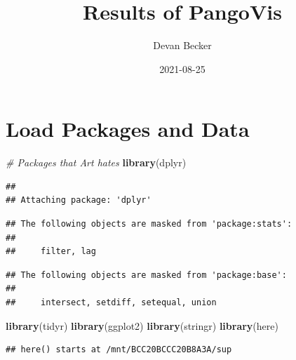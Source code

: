 \documentclass[
]{article}
\title{Results of PangoVis}
\author{Devan Becker}
\date{2021-08-25}
\newenvironment{Shaded}{\begin{snugshade}}{\end{snugshade}}
\newcommand{\CommentTok}[1]{\textcolor[rgb]{0.56,0.35,0.01}{\textit{#1}}}
\newcommand{\KeywordTok}[1]{\textcolor[rgb]{0.13,0.29,0.53}{\textbf{#1}}}
\newcommand{\NormalTok}[1]{#1}
\begin{document}
\maketitle

\hypertarget{load-packages-and-data}{%
\section{Load Packages and Data}\label{load-packages-and-data}}

\begin{Shaded}
\begin{Highlighting}[]
\CommentTok{\# Packages that Art hates}
\KeywordTok{library}\NormalTok{(dplyr)}
\end{Highlighting}
\end{Shaded}

\begin{verbatim}
## 
## Attaching package: 'dplyr'
\end{verbatim}

\begin{verbatim}
## The following objects are masked from 'package:stats':
## 
##     filter, lag
\end{verbatim}

\begin{verbatim}
## The following objects are masked from 'package:base':
## 
##     intersect, setdiff, setequal, union
\end{verbatim}

\begin{Shaded}
\begin{Highlighting}[]
\KeywordTok{library}\NormalTok{(tidyr)}
\KeywordTok{library}\NormalTok{(ggplot2)}
\KeywordTok{library}\NormalTok{(stringr)}
\KeywordTok{library}\NormalTok{(here)}
\end{Highlighting}
\end{Shaded}

\begin{verbatim}
## here() starts at /mnt/BCC20BCCC20B8A3A/sup
\end{verbatim}
\end{document}
